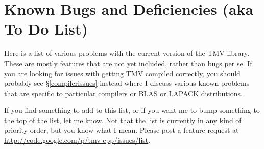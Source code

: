 \documentclass[twoside,letterpaper,11pt]{article}
\newcommand{\myissuesx}{http://code.google.com/p/tmv-cpp/issues/list}
\newcommand{\myissues}{\url{\myissuesx}}
\begin{document}
\newpage
\section{Known Bugs and Deficiencies (aka To Do List)}

Here is a list of various problems with the current version of the TMV library.
These are mostly features that are not yet included, rather than bugs per se.
If you are looking for issues with getting TMV compiled correctly, you should
probably see \S\ref{compilerissues} instead where I discuss various known
problems that are specific to particular compilers or BLAS or LAPACK 
distributions.  

If you find something to add to this list, or if you want me to bump something
to the top of the list, let me know.  Not that the list is currently in any kind of 
priority order, but you know what I mean.  Please post a feature request
at \myissues.
\end{document}
